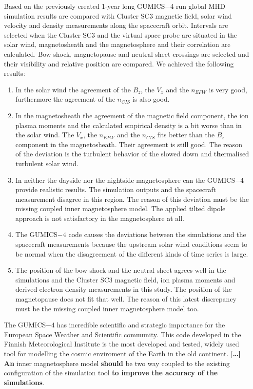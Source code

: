 \documentclass[linenumbers,draft]{agujournal}
\begin{document}
Based on the previously created 1-year long GUMICS$-$4 run global MHD simulation results are compared with Cluster SC3 magnetic field, solar wind velocity and density measurements along the spacecraft orbit. Intervals are selected when the Cluster SC3 and the virtual space probe are situated in the solar wind, magnetosheath and the magnetosphere and their correlation are calculated. Bow shock, magnetopause and neutral sheet crossings are selected and their visibility and relative position are compared. We achieved the following results:
\begin{enumerate}
\item In the solar wind the agreement of the $B_{z}$, the $V_{x}$ and the $n_{EFW}$ is very good, furthermore the agreement of the $n_{CIS}$ is also good.
\item In the magnetosheath the agreement of the magnetic field component, the ion plasma moments and the calculated empirical density is a bit worse than in the solar wind. The $V_{x}$, the $n_{EFW}$ and the $n_{CIS}$ fits better than the $B_{z}$ component in the magnetosheath. Their agreement is still good. The reason of the deviation is the turbulent behavior of the slowed down and t\textbf{h}ermalised turbulent solar wind.
\item In neither the dayside nor the nightside magnetosphere can the GUMICS$-$4 provide realistic results. The simulation outputs and the spacecraft measurement disagree in this region. The reason of this deviation must be the missing coupled inner magnetosphere model. The applied tilted dipole approach is not satisfactory in the magnetosphere at all. 
\item The GUMICS$-$4 code causes the deviations between the simulations and the spacecraft measurements because the upstream solar wind conditions seem to be normal when the disagreement of the different kinds of time series is large.
\item The position of the bow shock and the neutral sheet agrees well in the simulations and the Cluster SC3 magnetic field, ion plasma moments and derived electron density measurements in this study. The position of the magnetopause does not fit that well. The reason of this latest discrepancy must be the missing coupled inner magnetosphere model too.
\end{enumerate}
The GUMICS$-$4 has incredible scientific and strategic importance for the European Space Weather and Scientific community. This code developed in the Finnish Meteorological Institute is the most developed and tested, widely used tool for modelling the cosmic enviroment of the Earth in the old continent. \textbf{[\dots] An} inner magnetosphere model \textbf{should} be two way coupled to the existing configuration of the simulation tool \textbf{to improve the accuracy of the simulations}.
\end{document}
